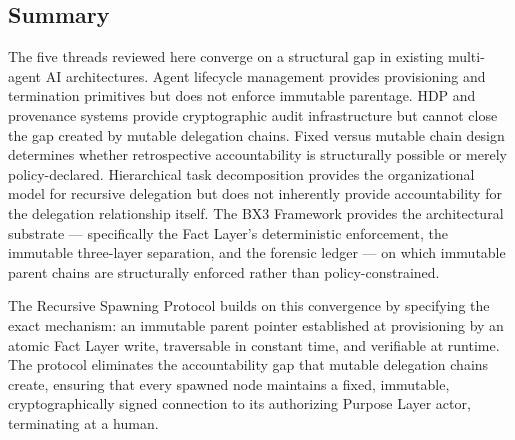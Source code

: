 \subsection{Summary}
\label{sec:background-summary}

The five threads reviewed here converge on a structural gap in existing multi-agent AI architectures. Agent lifecycle management provides provisioning and termination primitives but does not enforce immutable parentage. HDP and provenance systems provide cryptographic audit infrastructure but cannot close the gap created by mutable delegation chains. Fixed versus mutable chain design determines whether retrospective accountability is structurally possible or merely policy-declared. Hierarchical task decomposition provides the organizational model for recursive delegation but does not inherently provide accountability for the delegation relationship itself. The BX3 Framework provides the architectural substrate — specifically the Fact Layer's deterministic enforcement, the immutable three-layer separation, and the forensic ledger — on which immutable parent chains are structurally enforced rather than policy-constrained.

The Recursive Spawning Protocol builds on this convergence by specifying the exact mechanism: an immutable parent pointer established at provisioning by an atomic Fact Layer write, traversable in constant time, and verifiable at runtime. The protocol eliminates the accountability gap that mutable delegation chains create, ensuring that every spawned node maintains a fixed, immutable, cryptographically signed connection to its authorizing Purpose Layer actor, terminating at a human.

